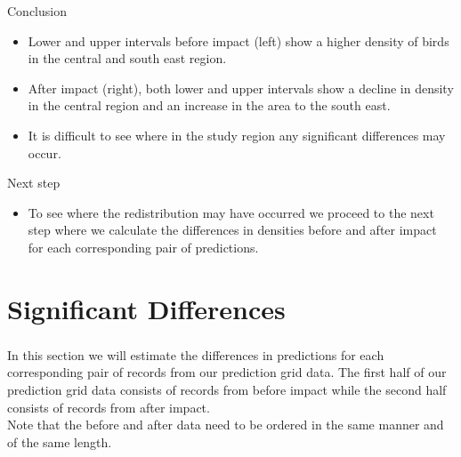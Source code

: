 \begin{block}{Conclusion}
\begin{itemize}
  \item Lower and upper intervals before impact (left) show a higher density of birds in the central and south east region.  
  \item After impact (right), both lower and upper intervals show a decline in density in the central region and an increase in the area to the south east.  
  \item It is difficult to see where in the study region any significant differences may occur.
\end{itemize}
\end{block}
\begin{block}{Next step}
\begin{itemize}
\item{To see where the redistribution may have occurred we proceed to the next step where we calculate the differences in densities before and after impact for each corresponding pair of predictions.}
\end{itemize}
\end{block}

\section{Significant Differences}
\frametitle{}
\noindent In this section we will estimate the differences in predictions for each corresponding pair of records from our prediction grid data. The first half of our prediction grid data consists of records from before impact while the second half consists of records from after impact. \\

\noindent Note that the before and after data need to be ordered in the same manner and of the same length. 


